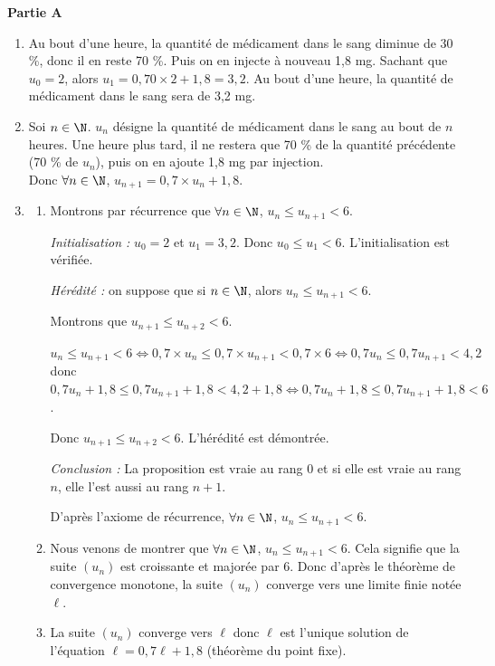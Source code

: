 \medskip
\textbf{Partie A}
\medskip

\begin{enumerate}
	\item Au bout d'une heure, la quantité de médicament dans le sang diminue de 30 \%, donc il en reste 70 \%. Puis on en injecte à nouveau 1,8 mg. Sachant que $u_0=2$, alors $u_1=0,70\times 2+1,8=3,2$. Au bout d'une heure, la quantité de médicament dans le sang sera de 3,2 mg.
	\item Soi $n\in \N$. $u_n$ désigne la quantité de médicament dans le sang au bout de $n$ heures. Une heure plus tard, il ne restera que 70 \% de la quantité précédente (70 \% de $u_n$), puis on en ajoute 1,8 mg par injection.\\
	Donc $\forall n \in \N$, $u_{n+1}=0,7\times u_n+1,8$.
	\item \begin{enumerate}
		\item Montrons par récurrence que $\forall n \in \N$, $u_n\leqslant u_{n+1} <6$.
		
\textit{Initialisation :} $u_0=2$ et $u_1=3,2$. Donc $u_0\leqslant u_1<6$. L'initialisation est vérifiée.

\textit{Hérédité :} on suppose que si $n \in \N$, alors $u_n\leqslant u_{n+1} < 6$.
		
Montrons que $u_{n+1}\leqslant u_{n+2} < 6$.

$u_n\leqslant u_{n+1} < 6\iff 0,7 \times u_n\leqslant 0,7\times u_{n+1} <0,7 \times 6\iff 0,7 u_n\leqslant 0,7 u_{n+1} < 4,2$\\ donc $0,7 u_n+1,8\leqslant 0,7 u_{n+1}+ 1,8 < 4,2 + 1,8 \iff 0,7 u_n + 1,8 \leqslant 0,7 u_{n+1} + 1,8 < 6$.

Donc $u_{n+1}\leqslant u_{n+2}< 6$. L'hérédité est démontrée.

		\textit{Conclusion : }  La proposition est vraie au rang $0$ et si elle est vraie au rang $n$, elle l'est aussi au rang $n + 1$.
		
D'après l'axiome de récurrence, $\forall n \in \N$, $u_n\leqslant u_{n+1} < 6$.
		\item Nous venons de montrer que $\forall n \in \N$, $u_n\leqslant u_{n+1} < 6$. Cela signifie que la suite $\left(u_n\right)$ est croissante et majorée par 6. Donc d'après le théorème de convergence monotone, la suite $\left(u_n\right)$ converge vers une limite finie notée $\ell$.
		\item La suite $\left(u_n\right)$ converge vers $\ell$ donc $\ell$ est l'unique solution de l'équation $\ell = 0,7\ell + 1,8$ (théorème du point fixe).
		

\end{enumerate}
\end{enumerate}
